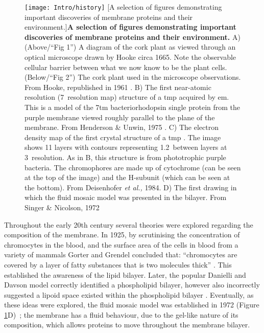 \begin{figure}[ht!]
\centering
\texttt{[image: Intro/history]}
		[A selection of figures demonstrating important discoveries of membrane proteins and their environment.]{\textbf{A selection of figures demonstrating important discoveries of membrane proteins and their environment.}
		A) (Above/``Fig 1'') A diagram of the cork plant as viewed through an optical microscope drawn by Hooke circa 1665.
		Note the observable cellular barrier between what we now know to be the plant cells.
		(Below/``Fig 2'') The cork plant used in the microscope observations.
		From Hooke, republished in 1961 \cite{hooke1961micrographia}.
		B) The first near\--atomic resolution (7\angstrom~resolution map) structure of a \gls{tmp} acquired by \gls{em}.
		This is a model of the 7\gls{tm} bacteriorhodopsin single protein from the purple membrane viewed roughly parallel to the plane of the membrane.
		From Henderson \& Unwin, 1975 \cite{Henderson1975}.
		C) The electron density map of the first crystal structure of a \gls{tmp} \cite{Deisenhofer1984}.
		The image shows 11 layers with contours representing 1.2\angstrom~between layers at 3\angstrom~resolution.
		As in B, this structure is from phototrophic purple bacteria.
		The chromophores are made up of cytochrome (can be seen at the top of the image) and the H\--subunit (which can be seen at the bottom).
		From Deisenhofer \textit{et al.,} 1984.
		D) The first drawing in which the fluid mosaic model was presented in the bilayer.
		From Singer \& Nicolson, 1972 \cite{Singer1972}
		}

\label{fig:history}
\end{figure}

Throughout the early 20th century several theories were explored regarding the composition of the membrane.
In 1925, by scrutinising the concentration of chromocytes in the blood, and the surface area of the cells in blood from a variety of mammals Gorter and Grendel concluded that: ``chromocytes are covered by a layer of fatty substances that is two molecules thick'' \cite{Gorter1925}.
This established the awareness of the lipid bilayer.
Later, the popular Danielli and Davson model correctly identified a phospholipid bilayer, however also incorrectly suggested a lipoid space existed within the phospholipid bilayer \cite{Danielli1935}.
Eventually, as these ideas were explored, the fluid mosaic model was established in 1972 (Figure \ref{fig:history}D)~\cite{Singer1972}; the membrane has a fluid behaviour, due to the gel\--like nature of its composition, which allows proteins to move throughout the membrane bilayer.

